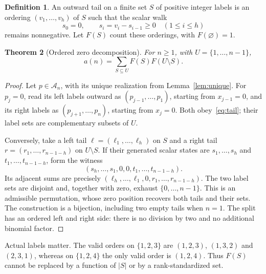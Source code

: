\documentclass[11pt]{article}
\newtheorem{theorem}{Theorem}[section]
\theoremstyle{definition}
\newtheorem{definition}[theorem]{Definition}
\theoremstyle{remark}
\newcommand{\An}{\mathcal A_n}
\begin{document}
\begin{definition}
An outward tail on a finite set $S$ of positive integer labels is an ordering
$(v_1,\ldots,v_h)$ of $S$ such that the scalar walk
\begin{equation}
 s_0=0,\qquad s_i=v_i-s_{i-1}\geq0\quad(1\leq i\leq h)
 \label{eq:tail}
\end{equation}
remains nonnegative. Let $F(S)$ count these orderings, with
$F(\varnothing)=1$.
\end{definition}

\begin{theorem}[Ordered zero decomposition]
\label{thm:split}
For $n\geq1$, with $U=\{1,\ldots,n-1\}$,
\begin{equation}
 a(n)=\sum_{S\subseteq U}F(S)F(U\setminus S).
 \label{eq:split}
\end{equation}
\end{theorem}
\begin{proof}
Let $p\in\An$, with its unique realization from Lemma~\ref{lem:unique}.
For $p_j=0$, read its left labels outward as
$(p_{j-1},\ldots,p_1)$, starting from $x_{j-1}=0$, and its right labels
as $(p_{j+1},\ldots,p_n)$, starting from $x_j=0$.
Both obey~\eqref{eq:tail}; their label sets are complementary subsets of $U$.

Conversely, take a left tail $\ell=(\ell_1,\ldots,\ell_h)$ on $S$ and a
right tail $r=(r_1,\ldots,r_{n-1-h})$ on $U\setminus S$. If their
generated scalar states are $s_1,\ldots,s_h$ and
$t_1,\ldots,t_{n-1-h}$, form the witness
\[
 (s_h,\ldots,s_1,0,0,t_1,\ldots,t_{n-1-h}).
\]
Its adjacent sums are precisely
$(\ell_h,\ldots,\ell_1,0,r_1,\ldots,r_{n-1-h})$.
The two label sets are disjoint and, together with zero, exhaust
$\{0,\ldots,n-1\}$. This is an admissible permutation, whose zero position recovers both tails
and their sets. The construction is a bijection, including two empty tails
when $n=1$. The split has an ordered left and right side: there is no
division by two and no additional binomial factor.
\end{proof}

Actual labels matter. The valid orders on $\{1,2,3\}$ are
$(1,2,3)$, $(1,3,2)$ and $(2,3,1)$, whereas on $\{1,2,4\}$ the only
valid order is $(1,2,4)$. Thus $F(S)$ cannot be replaced by a function
of $|S|$ or by a rank-standardized set.
\end{document}

